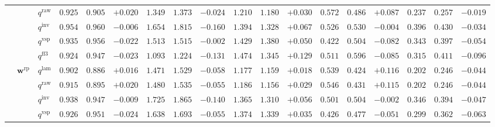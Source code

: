 \documentclass[eng]{kjas3}
\begin{document}
\begin{table}[t]
{\begin{tabular}{lll ccc ccc ccc ccc ccc}
 &  & $q^{\mathrm{raw}}$ & $0.925$ & $0.905$ & \cellcolor{posgreen!50}$+0.020$ & $1.349$ & $1.373$ & \cellcolor{negred!50}$-0.024$ & $1.210$ & $1.180$ & \cellcolor{posgreen!50}$+0.030$ & $0.572$ & $0.486$ & \cellcolor{posgreen!50}$+0.087$ & $0.237$ & $0.257$ & \cellcolor{negred!50}$-0.019$ \\
 &  & $q^{\mathrm{inv}}$ & $0.954$ & $0.960$ & \cellcolor{negred!50}$-0.006$ & $1.654$ & $1.815$ & \cellcolor{negred!50}$-0.160$ & $1.394$ & $1.328$ & \cellcolor{posgreen!50}$+0.067$ & $0.526$ & $0.530$ & \cellcolor{negred!50}$-0.004$ & $0.396$ & $0.430$ & \cellcolor{negred!50}$-0.034$ \\
 &  & $q^{\mathrm{vsp}}$ & $0.935$ & $0.956$ & \cellcolor{negred!50}$-0.022$ & $1.513$ & $1.515$ & \cellcolor{negred!50}$-0.002$ & $1.429$ & $1.380$ & \cellcolor{posgreen!50}$+0.050$ & $0.422$ & $0.504$ & \cellcolor{negred!50}$-0.082$ & $0.343$ & $0.397$ & \cellcolor{negred!50}$-0.054$ \\
 &  & $q^{\mathrm{ff3}}$ & $0.924$ & $0.947$ & \cellcolor{negred!50}$-0.023$ & $1.093$ & $1.224$ & \cellcolor{negred!50}$-0.131$ & $1.474$ & $1.345$ & \cellcolor{posgreen!50}$+0.129$ & $0.511$ & $0.596$ & \cellcolor{negred!50}$-0.085$ & $0.315$ & $0.411$ & \cellcolor{negred!50}$-0.096$ \\
\cmidrule(lr){2-18}
 & $\mathbf{w}^{\mathrm{rp}}$ & $q^{\mathrm{lam}}$ & $0.902$ & $0.886$ & \cellcolor{posgreen!50}$+0.016$ & $1.471$ & $1.529$ & \cellcolor{negred!50}$-0.058$ & $1.177$ & $1.159$ & \cellcolor{posgreen!50}$+0.018$ & $0.539$ & $0.424$ & \cellcolor{posgreen!50}$+0.116$ & $0.202$ & $0.246$ & \cellcolor{negred!50}$-0.044$ \\
 &  & $q^{\mathrm{raw}}$ & $0.915$ & $0.895$ & \cellcolor{posgreen!50}$+0.020$ & $1.480$ & $1.535$ & \cellcolor{negred!50}$-0.055$ & $1.186$ & $1.156$ & \cellcolor{posgreen!50}$+0.029$ & $0.546$ & $0.431$ & \cellcolor{posgreen!50}$+0.115$ & $0.202$ & $0.246$ & \cellcolor{negred!50}$-0.044$ \\
 &  & $q^{\mathrm{inv}}$ & $0.938$ & $0.947$ & \cellcolor{negred!50}$-0.009$ & $1.725$ & $1.865$ & \cellcolor{negred!50}$-0.140$ & $1.365$ & $1.310$ & \cellcolor{posgreen!50}$+0.056$ & $0.501$ & $0.504$ & \cellcolor{negred!50}$-0.002$ & $0.346$ & $0.394$ & \cellcolor{negred!50}$-0.047$ \\
 &  & $q^{\mathrm{vsp}}$ & $0.926$ & $0.951$ & \cellcolor{negred!50}$-0.024$ & $1.638$ & $1.693$ & \cellcolor{negred!50}$-0.055$ & $1.374$ & $1.339$ & \cellcolor{posgreen!50}$+0.035$ & $0.426$ & $0.477$ & \cellcolor{negred!50}$-0.051$ & $0.299$ & $0.362$ & \cellcolor{negred!50}$-0.063$ \\

\end{tabular}}
\end{table}
\end{document}
